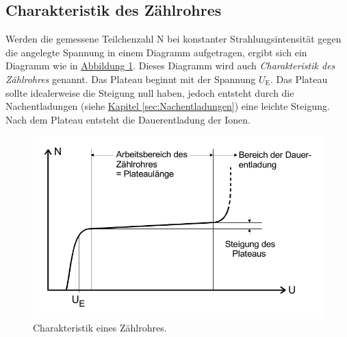 \subsection{Charakteristik des Zählrohres}
Werden die gemessene Teilchenzahl N bei konstanter Strahlungsintensität gegen die angelegte Spannung in einem
Diagramm aufgetragen, ergibt sich ein Diagramm wie in \hyperref[fig:Diagramm3]{Abbildung \ref{fig:Diagramm3}}.
Dieses Diagramm wird auch \textit{Charakteristik des Zählrohres} genannt.
Das Plateau beginnt mit der Spannung $U_\text{E}$.
Das Plateau sollte idealerweise die Steigung null haben, jedoch entsteht durch die Nachentladungen (siehe \hyperref[sec:Nachentladungen]{Kapitel \ref{sec:Nachentladungen}})
eine leichte Steigung. Nach dem Plateau entsteht die Dauerentladung der Ionen.
\begin{figure}
    \center
    \includegraphics[width=0.7\linewidth]{pictures/Diagramm3.pdf}
    \caption{Charakteristik eines Zählrohres.}\label{fig:Diagramm3}
\end{figure}